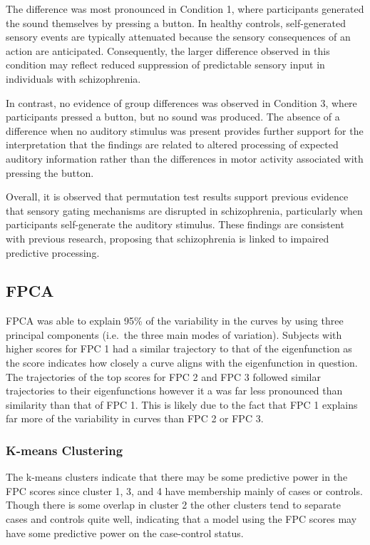 \documentclass{article}
\begin{document}
The difference was most pronounced in Condition 1, where participants
generated the sound themselves by pressing a button. In healthy
controls, self-generated sensory events are typically attenuated because
the sensory consequences of an action are anticipated. Consequently, the
larger difference observed in this condition may reflect reduced
suppression of predictable sensory input in individuals with
schizophrenia.

In contrast, no evidence of group differences was observed in Condition
3, where participants pressed a button, but no sound was produced. The
absence of a difference when no auditory stimulus was present provides
further support for the interpretation that the findings are related to
altered processing of expected auditory information rather than the
differences in motor activity associated with pressing the button.

Overall, it is observed that permutation test results support previous
evidence that sensory gating mechanisms are disrupted in schizophrenia,
particularly when participants self-generate the auditory stimulus.
These findings are consistent with previous research, proposing that
schizophrenia is linked to impaired predictive processing.

\subsection{FPCA}\label{fpca}

FPCA was able to explain 95\% of the variability in the curves by using
three principal components (i.e.~the three main modes of variation).
Subjects with higher scores for FPC 1 had a similar trajectory to that
of the eigenfunction as the score indicates how closely a curve aligns
with the eigenfunction in question. The trajectories of the top scores
for FPC 2 and FPC 3 followed similar trajectories to their
eigenfunctions however it a was far less pronounced than similarity than
that of FPC 1. This is likely due to the fact that FPC 1 explains far
more of the variability in curves than FPC 2 or FPC 3.

\subsubsection{K-means Clustering}\label{k-means-clustering-1}

The k-means clusters indicate that there may be some predictive power in
the FPC scores since cluster 1, 3, and 4 have membership mainly of cases
or controls. Though there is some overlap in cluster 2 the other
clusters tend to separate cases and controls quite well, indicating that
a model using the FPC scores may have some predictive power on the
case-control status.
\end{document}
